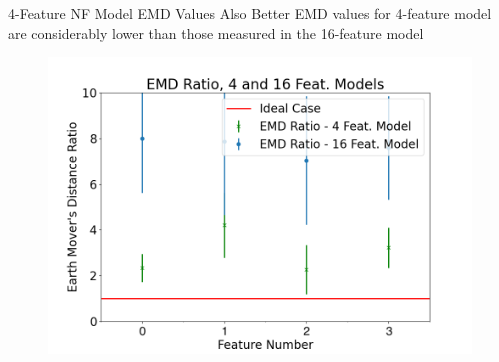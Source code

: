 \documentclass[aspectratio=169]{beamer}
\begin{document}
\begin{frame}{4-Feature NF Model EMD Values Also Better}
EMD values for 4-feature model are considerably lower than those measured in the 16-feature model
\begin{figure}[!h]
    \centering
    \includegraphics[scale=0.35]{images/EMD/emdratio416.png}
    \label{fig:EMD}
\end{figure}
\end{frame}
\end{document}
